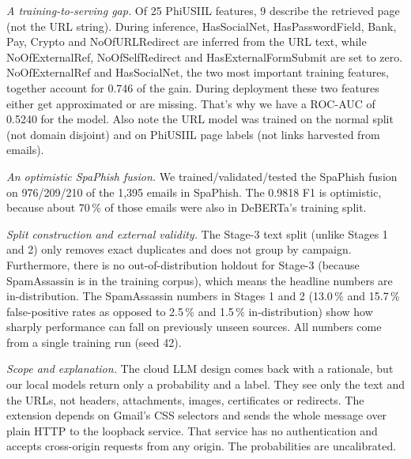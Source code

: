 \documentclass[conference]{IEEEtran}
\begin{document}
\emph{A training-to-serving gap.} Of 25 PhiUSIIL features, 9 describe the retrieved page (not the URL string). During inference, HasSocialNet, HasPasswordField, Bank, Pay, Crypto and NoOfURLRedirect are inferred from the URL text, while NoOfExternalRef, NoOfSelfRedirect and HasExternalFormSubmit are set to zero. NoOfExternalRef and HasSocialNet, the two most important training features, together account for 0.746 of the gain. During deployment these two features either get approximated or are missing. That's why we have a ROC-AUC of 0.5240 for the model. Also note the URL model was trained on the normal split (not domain disjoint) and on PhiUSIIL page labels (not links harvested from emails).

\emph{An optimistic SpaPhish fusion.} We trained/validated/tested the SpaPhish fusion on 976/209/210 of the 1,395 emails in SpaPhish. The 0.9818 F1 is optimistic, because about 70\,\% of those emails were also in DeBERTa's training split.

\emph{Split construction and external validity.} The Stage-3 text split (unlike Stages 1 and 2) only removes exact duplicates and does not group by campaign. Furthermore, there is no out-of-distribution holdout for Stage-3 (because SpamAssassin is in the training corpus), which means the headline numbers are in-distribution. The SpamAssassin numbers in Stages 1 and 2 (13.0\,\% and 15.7\,\% false-positive rates as opposed to 2.5\,\% and 1.5\,\% in-distribution) show how sharply performance can fall on previously unseen sources. All numbers come from a single training run (seed 42).

\emph{Scope and explanation.} The cloud LLM design \cite{pham2025demo} comes back with a rationale, but our local models return only a probability and a label. They see only the text and the URLs, not headers, attachments, images, certificates or redirects. The extension depends on Gmail's CSS selectors and sends the whole message over plain HTTP to the loopback service. That service has no authentication and accepts cross-origin requests from any origin. The probabilities are uncalibrated.
\end{document}
